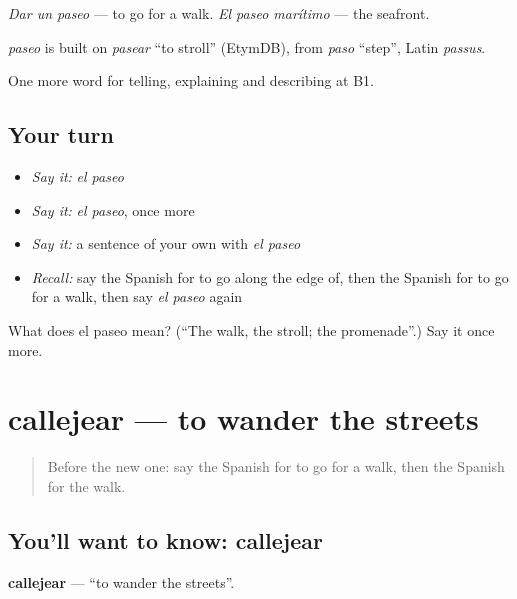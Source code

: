 \emph{Dar un paseo} — to go for a walk. \emph{El paseo marítimo} — the seafront.

\begin{cousinweb}
\emph{paseo} is built on \emph{pasear} \textquotedblleft{}to stroll\textquotedblright{} (EtymDB), from \emph{paso} \textquotedblleft{}step\textquotedblright{}, Latin \emph{passus}.
\end{cousinweb}

\begin{grammarlens}[title={What you've built}]
One more word for telling, explaining and describing at B1.
\end{grammarlens}

\subsection*{Your turn}
\begin{itemize}
\raggedright
  \item \emph{Say it:} \emph{el paseo}
  \item \emph{Say it:} \emph{el paseo}, once more
  \item \emph{Say it:} a sentence of your own with \emph{el paseo}
  \item \emph{Recall:} say the Spanish for to go along the edge of, then the Spanish for to go for a walk, then say \emph{el paseo} again
\end{itemize}

\begin{tcolorbox}[breakable,colback=teal!4,colframe=teal!35!black,title={Before you move on}]
What does el paseo mean? (\textquotedblleft{}The walk, the stroll; the promenade\textquotedblright{}.) Say it once more.
\end{tcolorbox}
\section[callejear]{callejear — to wander the streets}

\label{lesson:ES-C674-callejear}



\begin{quote}
Before the new one: say the Spanish for to go for a walk, then the Spanish for the walk.
\end{quote}

\subsection*{You'll want to know: callejear}
\textbf{callejear} — \textquotedblleft{}to wander the streets\textquotedblright{}.

